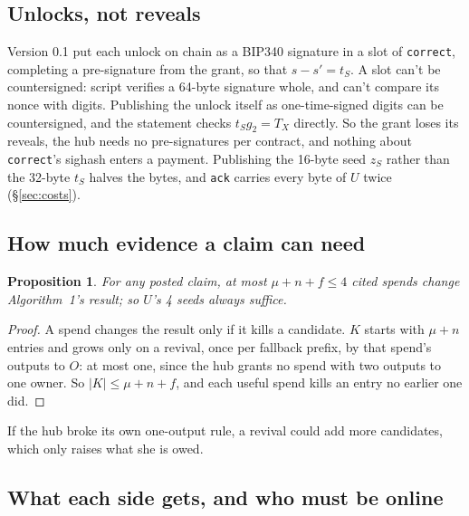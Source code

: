 \documentclass[11pt]{article}
\theoremstyle{plain}
\newtheorem{proposition}{Proposition}
\theoremstyle{definition}
\newcommand{\tx}[1]{\texttt{#1}}
\begin{document}
\subsection{Unlocks, not reveals}\label{sec:unlocks}

Version 0.1 put each unlock on chain as a BIP340 signature in a slot of
\tx{correct}, completing a pre-signature from the grant, so that $s - s'
= t_S$. A slot can't be countersigned: script verifies a 64-byte
signature whole, and can't compare its nonce with digits. Publishing
the unlock itself as one-time-signed digits can be countersigned, and
the statement checks $t_S g_2 = T_X$ directly. So the grant loses its
reveals, the hub needs no pre-signatures per contract, and nothing
about \tx{correct}'s sighash enters a payment. Publishing the 16-byte
seed $z_S$ rather than the 32-byte $t_S$ halves the bytes, and \tx{ack}
carries every byte of $U$ twice (\S\ref{sec:costs}).

\subsection{How much evidence a claim can need}\label{sec:volume}

\begin{proposition}\label{prop:volume}
For any posted claim, at most $\mu + n + f \le 4$ cited spends change
Algorithm~1's result; so $U$'s 4 seeds always suffice.
\end{proposition}
\begin{proof}
A spend changes the result only if it kills a candidate. $K$ starts with
$\mu + n$ entries and grows only on a revival, once per fallback prefix, by
that spend's outputs to $O$: at most one, since the hub grants no spend
with two outputs to one owner. So $|K| \le \mu + n + f$, and each useful
spend kills an entry no earlier one did.
\end{proof}

If the hub broke its own one-output rule, a revival could add more
candidates, which only raises what she is owed.

\subsection{What each side gets, and who must be online}\label{sec:who}
\end{document}

